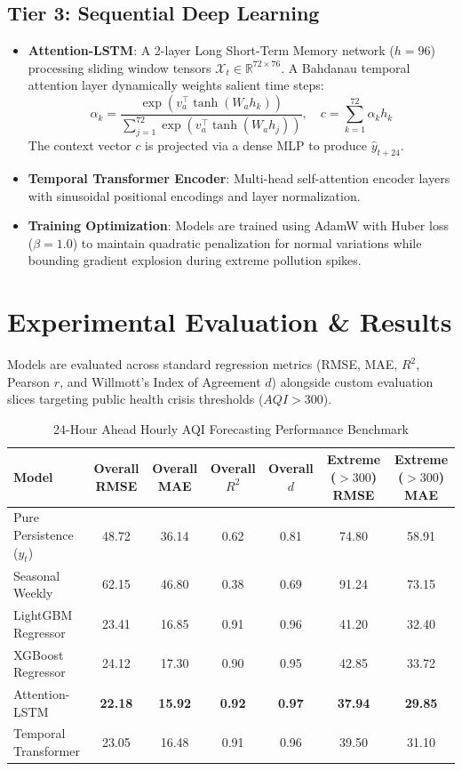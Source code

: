 \documentclass[10pt,journal,compsoc,twocolumn]{article}
\begin{document}
\subsection{Tier 3: Sequential Deep Learning}
\begin{itemize}
    \item \textbf{Attention-LSTM}: A 2-layer Long Short-Term Memory network ($h = 96$) processing sliding window tensors $\mathcal{X}_t \in \mathbb{R}^{72 \times 76}$. A Bahdanau temporal attention layer dynamically weights salient time steps:
    \begin{equation}
        \alpha_k = \frac{\exp(v_a^\top \tanh(W_a h_k))}{\sum_{j=1}^{72} \exp(v_a^\top \tanh(W_a h_j))}, \quad c = \sum_{k=1}^{72} \alpha_k h_k
    \end{equation}
    The context vector $c$ is projected via a dense MLP to produce $\hat{y}_{t+24}$.
    \item \textbf{Temporal Transformer Encoder}: Multi-head self-attention encoder layers with sinusoidal positional encodings and layer normalization.
    \item \textbf{Training Optimization}: Models are trained using AdamW with Huber loss ($\beta = 1.0$) to maintain quadratic penalization for normal variations while bounding gradient explosion during extreme pollution spikes.
\end{itemize}

\section{Experimental Evaluation \& Results}
Models are evaluated across standard regression metrics (RMSE, MAE, $R^2$, Pearson $r$, and Willmott's Index of Agreement $d$) alongside custom evaluation slices targeting public health crisis thresholds ($AQI > 300$).

\begin{table}[t]
\centering
\caption{24-Hour Ahead Hourly AQI Forecasting Performance Benchmark}
\label{tab:benchmark}
\begin{tabular}{lcccccc}
\toprule
\textbf{Model} & \textbf{Overall RMSE} & \textbf{Overall MAE} & \textbf{Overall $R^2$} & \textbf{Overall $d$} & \textbf{Extreme ($>300$) RMSE} & \textbf{Extreme ($>300$) MAE} \\
\midrule
Pure Persistence ($y_t$)     & 48.72 & 36.14 & 0.62 & 0.81 & 74.80 & 58.91 \\
Seasonal Weekly              & 62.15 & 46.80 & 0.38 & 0.69 & 91.24 & 73.15 \\
LightGBM Regressor           & 23.41 & 16.85 & 0.91 & 0.96 & 41.20 & 32.40 \\
XGBoost Regressor            & 24.12 & 17.30 & 0.90 & 0.95 & 42.85 & 33.72 \\
Attention-LSTM               & \textbf{22.18} & \textbf{15.92} & \textbf{0.92} & \textbf{0.97} & \textbf{37.94} & \textbf{29.85} \\
Temporal Transformer         & 23.05 & 16.48 & 0.91 & 0.96 & 39.50 & 31.10 \\
\bottomrule
\end{tabular}
\end{table}
\end{document}
